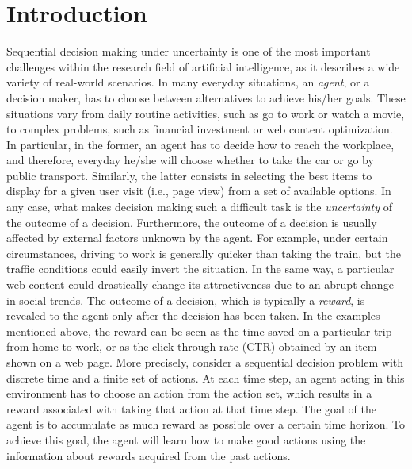 \chapter{Introduction}\label{C_INTRO}





Sequential decision making under uncertainty is one of the most important challenges within the research field of artificial intelligence, as it describes a wide variety of real-world scenarios. In many everyday situations, an \emph{agent}, or a decision maker, has to choose between alternatives to achieve his/her goals. These situations vary from daily routine activities, such as go to work or watch a movie, to complex problems, such as financial investment or web content optimization. In particular, in the former, an agent has to decide how to reach the workplace, and therefore, everyday he/she will choose whether to take the car or go by public transport. Similarly, the latter consists in selecting the best items to display for a given user visit (i.e., page view) from a set of available options. In any case, what makes decision making such a difficult task is the \emph{uncertainty} of the outcome of a decision. Furthermore, the outcome of a decision is usually affected by external factors unknown by the agent.
For example, under certain circumstances, driving to work is generally quicker than taking the train, but the traffic conditions could easily invert the situation. In the same way, a particular web content could drastically change its attractiveness due to an abrupt change in social trends. The outcome of a decision, which is typically a \emph{reward}, is revealed to the agent only after the decision has been taken. In the examples mentioned above, the reward can be seen as the time saved on a particular trip from home to work, or as the click-through rate (CTR) obtained by an item shown on a web page. More precisely, consider a sequential decision problem with discrete time and a finite set of actions. At each time step, an agent acting in this environment has to choose an action from the action set,  which results in a reward associated with taking that action at that time step. The goal of the agent is to accumulate as much reward as possible over a certain time horizon. To achieve this goal, the agent will learn how to make good actions using the information about rewards acquired from the past actions.
\\%
